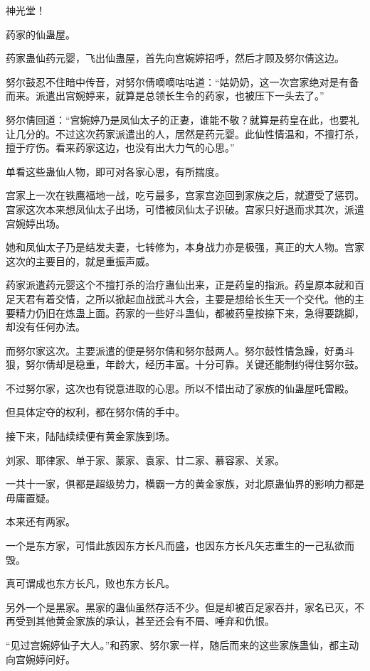\begin{this_body}
神光堂！

药家的仙蛊屋。

药家蛊仙药元婴，飞出仙蛊屋，首先向宫婉婷招呼，然后才顾及努尔倩这边。

努尔鼓忍不住暗中传音，对努尔倩嘀嘀咕咕道：“姑奶奶，这一次宫家绝对是有备而来。派遣出宫婉婷来，就算是总领长生令的药家，也被压下一头去了。”

努尔倩回道：“宫婉婷乃是凤仙太子的正妻，谁能不敬？就算是药皇在此，也要礼让几分的。不过这次药家派遣出的人，居然是药元婴。此仙性情温和，不擅打杀，擅于疗伤。看来药家这边，也没有出大力气的心思。”

单看这些蛊仙人物，即可对各家心思，有所揣度。

宫家上一次在铁鹰福地一战，吃亏最多，宫家宫迩回到家族之后，就遭受了惩罚。宫家这次本来想凤仙太子出场，可惜被凤仙太子识破。宫家只好退而求其次，派遣宫婉婷出场。

她和凤仙太子乃是结发夫妻，七转修为，本身战力亦是极强，真正的大人物。宫家这次的主要目的，就是重振声威。

药家派遣药元婴这个不擅打杀的治疗蛊仙出来，正是药皇的指派。药皇原本就和百足天君有着交情，之所以掀起血战武斗大会，主要是想给长生天一个交代。他的主要精力仍旧在炼蛊上面。药家的一些好斗蛊仙，都被药皇按捺下来，急得要跳脚，却没有任何办法。

而努尔家这次。主要派遣的便是努尔倩和努尔鼓两人。努尔鼓性情急躁，好勇斗狠，努尔倩却是稳重，年龄大，经历丰富。十分可靠。关键还能制约得住努尔鼓。

不过努尔家，这次也有锐意进取的心思。所以不惜出动了家族的仙蛊屋吒雷殿。

但具体定夺的权利，都在努尔倩的手中。

接下来，陆陆续续便有黄金家族到场。

刘家、耶律家、单于家、蒙家、袁家、廿二家、慕容家、关家。

一共十一家，俱都是超级势力，横霸一方的黄金家族，对北原蛊仙界的影响力都是毋庸置疑。

本来还有两家。

一个是东方家，可惜此族因东方长凡而盛，也因东方长凡矢志重生的一己私欲而毁。

真可谓成也东方长凡，败也东方长凡。

另外一个是黑家。黑家的蛊仙虽然存活不少。但是却被百足家吞并，家名已灭，不再受到其他黄金家族的承认，甚至还会有不屑、唾弃和仇恨。

“见过宫婉婷仙子大人。”和药家、努尔家一样，随后而来的这些家族蛊仙，都主动向宫婉婷问好。


\end{this_body}
